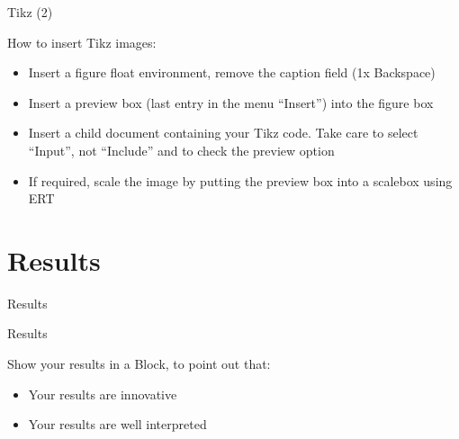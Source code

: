 \documentclass[english,american,german,aspectratio=43]{beamer}
\begin{document}
\begin{frame}{Tikz (2)}

  \begin{block}{How to insert Tikz images:}

    \begin{itemize}
      \item Insert a figure float environment, remove the caption
        field (1x Backspace)
      \item Insert a preview box (last entry in the menu ``Insert'') into the
        figure box
      \item Insert a child document containing your Tikz code. Take
        care to select
        ``Input'', not ``Include'' and to check the preview option
      \item If required, scale the image by putting the preview box
        into a scalebox
        using ERT
    \end{itemize}
  \end{block}
\end{frame}

\section{Results}
\begin{frame}{Results}

  \begin{center}
    \begin{figure}
      \scalebox{0.75}{}
    \end{figure}
    \par
  \end{center}
  \begin{alertblock}{Results}

    Show your results in a Block, to point out that:
    \begin{itemize}
      \item Your results are innovative
      \item Your results are well interpreted
    \end{itemize}
  \end{alertblock}
\end{frame}
\end{document}
